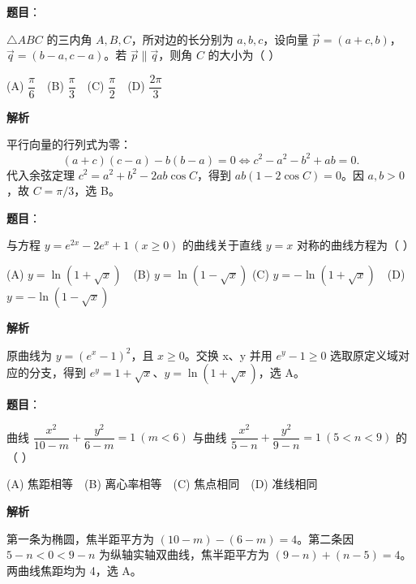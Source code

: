 \begin{answer}

\textbf{题目}：

$\triangle ABC$ 的三内角 $A,B,C$，所对边的长分别为 $a,b,c$，设向量 $\vec p=(a+c,b)$，$\vec q=(b-a,c-a)$。若 $\vec p\parallel\vec q$，则角 $C$ 的大小为（ ）

(A) $\dfrac{\pi}{6}$　(B) $\dfrac{\pi}{3}$　(C) $\dfrac{\pi}{2}$　(D) $\dfrac{2\pi}{3}$

\textbf{解析}

平行向量的行列式为零：
\nopagebreak[4]
\[
(a+c)(c-a)-b(b-a)=0
\iff c^2-a^2-b^2+ab=0.
\]
代入余弦定理 $c^2=a^2+b^2-2ab\cos C$，得到 $ab(1-2\cos C)=0$。因 $a,b>0$，故 $C=\pi/3$，选 B。


\end{answer}
\begin{answer}

\textbf{题目}：

与方程 $y=e^{2x}-2e^x+1\ (x\geq0)$ 的曲线关于直线 $y=x$ 对称的曲线方程为（ ）

(A) $y=\ln(1+\sqrt{x})$　(B) $y=\ln(1-\sqrt{x})$
(C) $y=-\ln(1+\sqrt{x})$　(D) $y=-\ln(1-\sqrt{x})$

\textbf{解析}

原曲线为 $y=(e^x-1)^2$，且 $x\ge0$。交换 x、y 并用 $e^y-1\ge0$ 选取原定义域对应的分支，得到 $e^y=1+\sqrt{x}$、$y=\ln(1+\sqrt{x})$，选 A。


\end{answer}
\begin{answer}

\textbf{题目}：

曲线 $\dfrac{x^2}{10-m}+\dfrac{y^2}{6-m}=1\ (m<6)$ 与曲线 $\dfrac{x^2}{5-n}+\dfrac{y^2}{9-n}=1\ (5<n<9)$ 的（ ）

(A) 焦距相等　(B) 离心率相等　(C) 焦点相同　(D) 准线相同

\textbf{解析}

第一条为椭圆，焦半距平方为 $(10-m)-(6-m)=4$。第二条因 $5-n<0<9-n$ 为纵轴实轴双曲线，焦半距平方为 $(9-n)+(n-5)=4$。两曲线焦距均为 4，选 A。


\end{answer}
